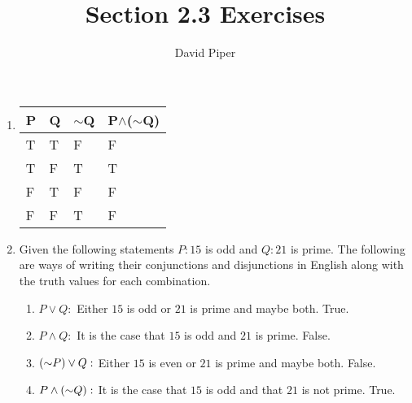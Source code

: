 \documentclass[12pt]{article}
\title{Section 2.3 Exercises}
\author{David Piper}
\makeatletter
\newcommand*{\arabicodd}[1]{%
  \expandafter\@arabicodd\csname c@#1\endcsname
}
\newcommand*{\@arabicodd}[1]{%
  \@arabic{\numexpr(#1)*2-1\relax}%
}
\makeatother
\begin{document}
\maketitle

\begin{enumerate}[label=2.\arabicodd*, start=8]
  \item
        \begin{tabular}{@{}llll@{}}
          \toprule
          P & Q & ${\sim}$Q & P$\land$(${\sim}$Q) \\ \midrule
          T & T & F       & F                            \\
          T & F & T       & T                            \\
          F & T & F       & F                            \\
          F & F & T       & F                            \\ \bottomrule
        \end{tabular}
  \item Given the following statements $P:15$ is odd and
        $Q: 21$ is prime. The following are ways of writing their
        conjunctions and disjunctions in English along with the truth
        values for each combination.
        \begin{enumerate}[label=(\alph*)]
          \item $P \lor Q:$ Either $15$ is odd or $21$ is prime and maybe
                both. True.
          \item $P \land Q:$ It is the case that $15$ is odd and $21$ is
                prime. False.
          \item $\qty({\sim}P) \lor Q:$ Either $15$ is even or $21$ is prime
                and maybe both. False.
          \item $P\land\qty({\sim}Q):$ It is the case that $15$ is odd and
                that $21$ is not prime. True.
        \end{enumerate}
\end{enumerate}
\end{document}
